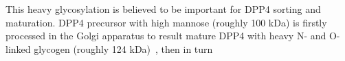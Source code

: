 This heavy glycosylation is believed to be important for DPP4 sorting and maturation.  DPP4 precursor with high mannose (roughly 100 kDa) is firstly processed in the Golgi apparatus to result mature DPP4 with heavy N- and O-linked glycogen (roughly 124 kDa)~\cite{Matter_1991}, then in turn